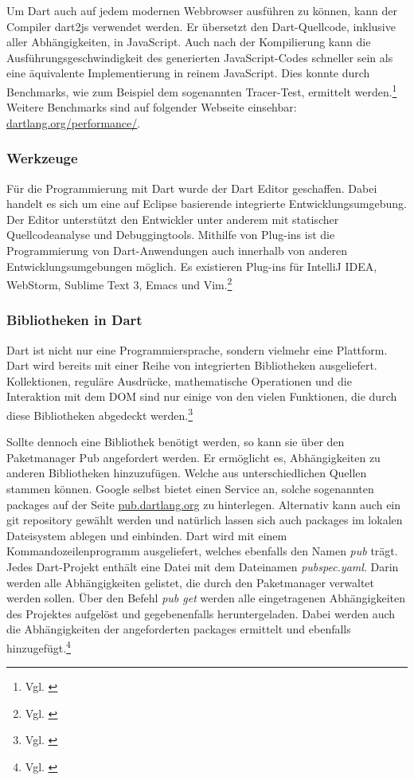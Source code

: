 Um Dart auch auf jedem modernen Webbrowser ausführen zu können, kann der Compiler dart2js verwendet werden. Er übersetzt den Dart-Quellcode, inklusive aller Abhängig\-keiten, in JavaScript. Auch nach der Kompilierung kann die Ausführungs\-geschwindig\-keit des generierten JavaScript-Codes schneller sein als eine äquivalente Implementierung in reinem JavaScript. Dies konnte durch Benchmarks, wie zum Beispiel dem sogenannten Tracer-Test, ermittelt werden.\footnote{Vgl. \cite[S. 2 f]{belchin2015advanced}}
Weitere Benchmarks sind auf folgender Webseite einsehbar: \url{dartlang.org/performance/}.

\subsubsection{Werkzeuge}

Für die Programmierung mit Dart wurde der Dart Editor geschaffen. Dabei handelt es sich um eine auf Eclipse basierende integrierte Entwicklungsumgebung. Der Editor unterstützt den Entwickler unter anderem mit statischer Quellcodeanalyse und Debuggingtools. Mithilfe von Plug-ins ist die Programmierung von Dart-Anwendungen auch innerhalb von anderen Entwicklungsumgebungen möglich. Es existieren Plug-ins für IntelliJ IDEA, WebStorm, Sublime Text 3, Emacs und Vim.\footnote{Vgl. \cite[o. S.]{akopkokhyants2014mastering}}

\subsubsection{Bibliotheken in Dart}

Dart ist nicht nur eine Programmiersprache, sondern vielmehr eine Plattform. Dart wird bereits mit einer Reihe von integrierten Bibliotheken ausgeliefert. Kollektionen, reguläre Ausdrücke, mathematische Operationen und die Interaktion mit dem DOM sind nur einige von den vielen Funktionen, die durch diese Bibliotheken abgedeckt werden.\footnote{Vgl. \cite[S. 4]{walrath2012dart}}

Sollte dennoch eine Bibliothek benötigt werden, so kann sie über den Paketmanager Pub angefordert werden. Er ermöglicht es, Abhängig\-keiten zu anderen Bibliotheken hinzuzufügen. Welche aus unterschiedlichen Quellen stammen können. Google selbst bietet einen Service an, solche sogenannten packages auf der Seite \url{pub.dartlang.org} zu hinterlegen. Alternativ kann auch ein git repository gewählt werden und natürlich lassen sich auch packages im lokalen Datei\-system ablegen und einbinden. Dart wird mit einem Kommando\-zeilen\-programm ausgeliefert, welches ebenfalls den Namen \textit{pub} trägt. Jedes Dart-Projekt enthält eine Datei mit dem Datei\-namen \textit{pubspec.yaml}. Darin werden alle Abhängig\-keiten gelistet, die durch den Paketmanager verwaltet werden sollen. Über den Befehl \textit{pub get} werden alle eingetragenen Abhängig\-keiten des Projektes aufgelöst und gegebenenfalls heruntergeladen. Dabei werden auch die Abhängig\-keiten der angeforderten packages ermittelt und ebenfalls hinzugefügt.\footnote{Vgl. \cite[S. 183]{kopec2014dart}}

